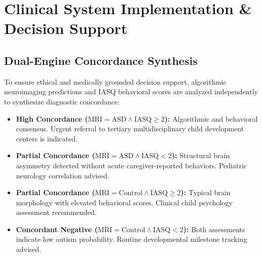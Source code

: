 \documentclass[conference]{IEEEtran}
\begin{document}
\section{Clinical System Implementation \& Decision Support}

\subsection{Dual-Engine Concordance Synthesis}
To ensure ethical and medically grounded decision support, algorithmic neuroimaging predictions and IASQ behavioral scores are analyzed independently to synthesize diagnostic concordance:
\begin{itemize}
    \item \textbf{High Concordance ($\text{MRI} = \text{ASD} \land \text{IASQ} \ge 2$):} Algorithmic and behavioral consensus. Urgent referral to tertiary multidisciplinary child development centers is indicated.
    \item \textbf{Partial Concordance ($\text{MRI} = \text{ASD} \land \text{IASQ} < 2$):} Structural brain asymmetry detected without acute caregiver-reported behaviors. Pediatric neurology correlation advised.
    \item \textbf{Partial Concordance ($\text{MRI} = \text{Control} \land \text{IASQ} \ge 2$):} Typical brain morphology with elevated behavioral scores. Clinical child psychology assessment recommended.
    \item \textbf{Concordant Negative ($\text{MRI} = \text{Control} \land \text{IASQ} < 2$):} Both assessments indicate low autism probability. Routine developmental milestone tracking advised.
\end{itemize}
\end{document}
